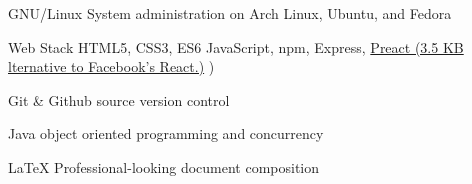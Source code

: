 

\begin{cvskills}

  \cvskill
    {GNU/Linux} %
    {System administration on Arch Linux, Ubuntu, and Fedora} %

  \cvskill
    {Web Stack} %
    {HTML5, CSS3, ES6 JavaScript, npm, Express, \href{https://preactjs.com/}{Preact (3.5 KB lternative to Facebook's React.)}
)} %

  \cvskill
    {Git \& Github} %
    {source version control} %

  \cvskill
    {Java} %
    {object oriented programming and concurrency} %

  \cvskill
    {LaTeX} %
    {Professional-looking document composition} %

\end{cvskills}
